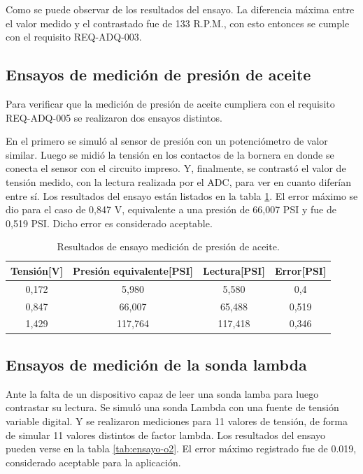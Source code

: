Como se puede observar de los resultados del ensayo. La diferencia máxima entre el valor medido y el contrastado fue de 133 R.P.M., con esto entonces se cumple con el requisito REQ-ADQ-003.

\break

\subsection{Ensayos de medición de presión de aceite}

Para verificar que la medición de presión de aceite cumpliera con el requisito REQ-ADQ-005 se realizaron dos ensayos distintos.

En el primero se simuló al sensor de presión con un potenciómetro de valor similar. Luego se midió la tensión en los contactos de la bornera en donde se conecta el sensor con el circuito impreso. Y, finalmente, se contrastó el valor de tensión medido, con la lectura realizada por el ADC, para ver en cuanto diferían entre sí. Los resultados del ensayo están listados en la tabla \ref{tab:ensayo-presion}. El error máximo se dio para el caso de 0,847 V, equivalente a una presión de 66,007 PSI y fue de 0,519 PSI. Dicho error es considerado aceptable. 

\begin{table}[htpb]
	\centering
	\caption{Resultados de ensayo medición de presión de aceite.}
	\centering
	\begin{tabular}{c c c c}    
		\toprule
		\textbf{Tensión[V]} & \textbf{Presión equivalente[PSI]} & \textbf{Lectura[PSI]} & \textbf{Error[PSI]}\\
		\midrule
		0,172		&   5,980 & 5,580 & 0,4 \\
		0,847		&   66,007 & 65,488 & 0,519 \\
		1,429		&   117,764 & 117,418 & 0,346 \\
		\bottomrule
	\end{tabular}
	\label{tab:ensayo-presion}
\end{table}

\subsection{Ensayos de medición de la sonda lambda}

Ante la falta de un dispositivo capaz de leer una sonda lamba para luego contrastar su lectura. Se simuló una sonda Lambda con una fuente de tensión variable digital. Y se realizaron mediciones para 11 valores de tensión, de forma de simular 11 valores distintos de factor lambda. Los resultados del ensayo pueden verse en la tabla \ref{tab:ensayo-o2}. El error máximo registrado fue de 0.019, considerado aceptable para la aplicación.

